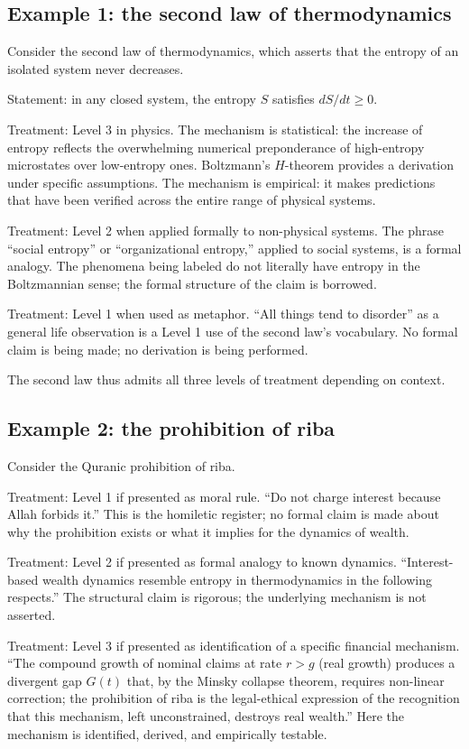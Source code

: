\subsection{Example 1: the second law of thermodynamics}

Consider the second law of thermodynamics, which asserts that the
entropy of an isolated system never decreases.

Statement: in any closed system, the entropy $S$ satisfies
$dS/dt \geq 0$.

Treatment: Level 3 in physics. The mechanism is statistical: the
increase of entropy reflects the overwhelming numerical preponderance
of high-entropy microstates over low-entropy ones. Boltzmann's
$H$-theorem provides a derivation under specific assumptions. The
mechanism is empirical: it makes predictions that have been verified
across the entire range of physical systems.

Treatment: Level 2 when applied formally to non-physical systems.
The phrase ``social entropy'' or ``organizational entropy,'' applied
to social systems, is a formal analogy. The phenomena being labeled
do not literally have entropy in the Boltzmannian sense; the formal
structure of the claim is borrowed.

Treatment: Level 1 when used as metaphor. ``All things tend to
disorder'' as a general life observation is a Level 1 use of the
second law's vocabulary. No formal claim is being made; no derivation
is being performed.

The second law thus admits all three levels of treatment depending
on context.

\subsection{Example 2: the prohibition of riba}

Consider the Quranic prohibition of riba.

Treatment: Level 1 if presented as moral rule. ``Do not charge
interest because Allah forbids it.'' This is the homiletic register;
no formal claim is made about why the prohibition exists or what it
implies for the dynamics of wealth.

Treatment: Level 2 if presented as formal analogy to known dynamics.
``Interest-based wealth dynamics resemble entropy in thermodynamics
in the following respects.'' The structural claim is rigorous; the
underlying mechanism is not asserted.

Treatment: Level 3 if presented as identification of a specific
financial mechanism. ``The compound growth of nominal claims at rate
$r > g$ (real growth) produces a divergent gap $G(t)$ that, by the
Minsky collapse theorem, requires non-linear correction; the
prohibition of riba is the legal-ethical expression of the
recognition that this mechanism, left unconstrained, destroys real
wealth.'' Here the mechanism is identified, derived, and empirically
testable.

